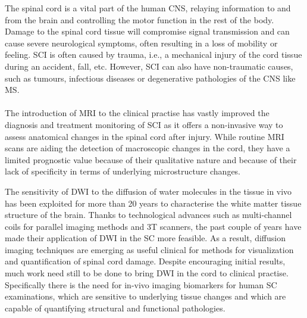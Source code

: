 The spinal cord is a vital part of the human \gls{CNS}, relaying information to and from the brain and controlling the motor function in the rest of the body. Damage to the spinal cord tissue will compromise signal transmission and can cause severe neurological symptoms, often resulting in a loss of mobility or feeling. \Gls{SCI} is often caused by trauma, i.e., a mechanical injury of the cord tissue during an accident, fall, etc. However, \gls{SCI} can also have non-traumatic causes, such as tumours, infectious diseases or degenerative pathologies of the \gls{CNS} like \gls{MS}.
\paragraph{}
The introduction of \gls{MRI} to the clinical practise has vastly improved the diagnosis and treatment monitoring of \gls{SCI} as it offers a non-invasive way to assess anatomical changes in the spinal cord after injury. While routine \gls{MRI} scans are aiding the detection of macroscopic changes in the cord, they have a limited prognostic value because of their qualitative nature and because of their lack of specificity in terms of underlying microstructure changes. 

The sensitivity of {\gls{DWI}} to the diffusion of water molecules in the tissue in vivo has been exploited for more than 20 years to characterise the white matter tissue structure of the brain. Thanks to technological advances such as multi-channel coils for parallel imaging methods and 3T scanners, the past couple of years have made their application of \gls{DWI} in the {\gls{SC}} more feasible. As a result, diffusion imaging techniques are emerging as useful clinical for methods for visualization and quantification of spinal cord damage. Despite encouraging initial results, much work need still to be done to bring \gls{DWI} in the cord to clinical practise. Specifically there is the need for in-vivo imaging biomarkers for human {\gls{SC}} examinations, which are sensitive to underlying tissue changes and which are capable of quantifying structural and functional pathologies.





